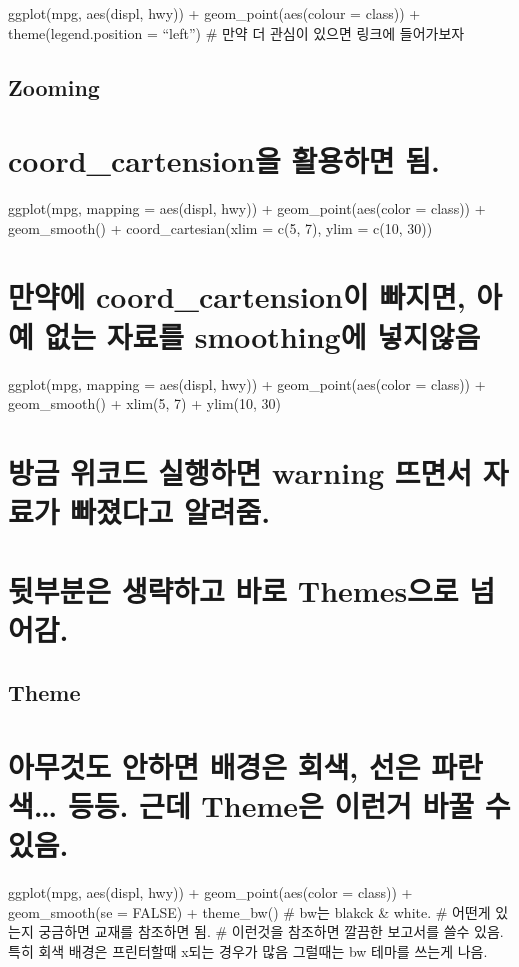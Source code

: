 \documentclass[]{article}
\begin{document}
ggplot(mpg, aes(displ, hwy)) + geom\_point(aes(colour = class)) +
theme(legend.position = ``left'') \# 만약 더 관심이 있으면 링크에
들어가보자

\subsection{Zooming}\label{zooming}

\section{coord\_cartension을 활용하면 됨.}\label{coord_cartension--.}

ggplot(mpg, mapping = aes(displ, hwy)) + geom\_point(aes(color = class))
+ geom\_smooth() + coord\_cartesian(xlim = c(5, 7), ylim = c(10, 30))

\section{만약에 coord\_cartension이 빠지면, 아예 없는 자료를 smoothing에
넣지않음}\label{-coord_cartension-----smoothing-}

ggplot(mpg, mapping = aes(displ, hwy)) + geom\_point(aes(color = class))
+ geom\_smooth() + xlim(5, 7) + ylim(10, 30)

\section{방금 위코드 실행하면 warning 뜨면서 자료가 빠졌다고
알려줌.}\label{---warning----.}

\section{뒷부분은 생략하고 바로 Themes으로 넘어감.}\label{---themes-.}

\subsection{Theme}\label{theme}

\section{아무것도 안하면 배경은 회색, 선은 파란색\ldots{} 등등. 근데
Theme은 이런거 바꿀 수 있음.}\label{------.--theme----.}

ggplot(mpg, aes(displ, hwy)) + geom\_point(aes(color = class)) +
geom\_smooth(se = FALSE) + theme\_bw() \# bw는 blakck \& white. \#
어떤게 있는지 궁금하면 교재를 참조하면 됨. \# 이런것을 참조하면 깔끔한
보고서를 쓸수 있음. 특히 회색 배경은 프린터할때 x되는 경우가 많음
그럴때는 bw 테마를 쓰는게 나음.
\end{document}
